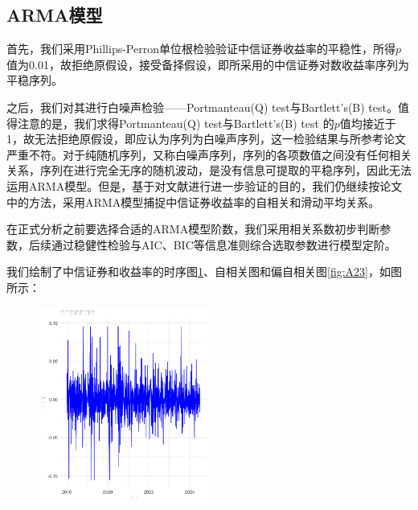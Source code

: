 \documentclass[12pt]{article}
\begin{document}
\subsection{ARMA模型}
首先，我们采用Phillips-Perron单位根检验验证中信证券收益率的平稳性，所得$p$值为0.01，故拒绝原假设，接受备择假设，即所采用的中信证券对数收益率序列为平稳序列。

之后，我们对其进行白噪声检验——Portmanteau(Q) test与Bartlett's(B) test。值得注意的是，我们求得Portmanteau(Q) test与Bartlett's(B) test 的$p$值均接近于1，故无法拒绝原假设，即应认为序列为白噪声序列，这一检验结果与所参考论文严重不符。对于纯随机序列，又称白噪声序列，序列的各项数值之间没有任何相关关系，序列在进行完全无序的随机波动，是没有信息可提取的平稳序列，因此无法运用ARMA模型。但是，基于对文献进行进一步验证的目的，我们仍继续按论文中的方法，采用ARMA模型捕捉中信证券收益率的自相关和滑动平均关系。

在正式分析之前要选择合适的ARMA模型阶数，我们采用相关系数初步判断参数，后续通过稳健性检验与AIC、BIC等信息准则综合选取参数进行模型定阶。

我们绘制了中信证券和收益率的时序图\ref{fig:A1}、自相关图和偏自相关图\ref{fig:A23}，如图所示：

\begin{figure}[H]
\centering
\includegraphics[width=0.5\textwidth]{A1.png}
\caption{}
\label{fig:A1}
\end{figure}
\end{document}
